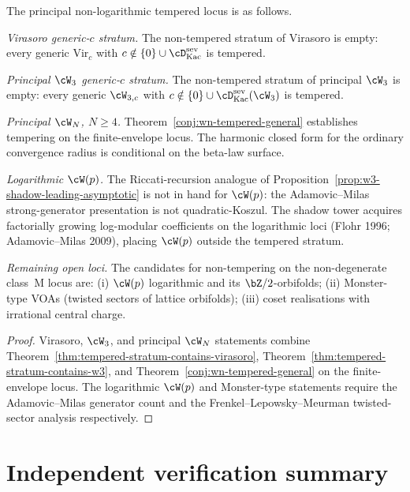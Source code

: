 \begin{corollary}
\label{cor:original-complex-dichotomy-healed}
The principal non-logarithmic tempered locus is as follows.

\emph{Virasoro generic-$c$ stratum.} The non-tempered stratum of
Virasoro is empty: every generic $\mathrm{Vir}_c$ with
$c \notin \{0\} \cup \cD^{\mathrm{sev}}_{\mathrm{Kac}}$ is tempered.

\emph{Principal $\cW_3$ generic-$c$ stratum.} The non-tempered stratum
of principal $\cW_3$ is empty: every generic
$\cW_{3, c}$ with $c \notin \{0\} \cup
\cD^{\mathrm{sev}}_{\mathrm{Kac}}(\cW_3)$ is tempered.

\emph{Principal $\cW_N$, $N \ge 4$.}
Theorem~\ref{conj:wn-tempered-general} establishes tempering on the
finite-envelope locus. The harmonic closed form for the ordinary
convergence radius is conditional on the beta-law surface.

\emph{Logarithmic $\cW(p)$.} The Riccati-recursion analogue of
Proposition~\ref{prop:w3-shadow-leading-asymptotic} is not in hand for
$\cW(p)$: the Adamovic--Milas strong-generator presentation is not
quadratic-Koszul. The shadow tower acquires factorially growing
log-modular coefficients on the logarithmic loci (Flohr 1996;
Adamovic--Milas 2009), placing $\cW(p)$ outside the tempered stratum.

\emph{Remaining open loci.} The candidates for non-tempering on the
non-degenerate class~M locus are: (i) $\cW(p)$ logarithmic and its
$\bZ/2$-orbifolds; (ii) Monster-type VOAs (twisted sectors of
lattice orbifolds); (iii) coset realisations with irrational central
charge.
\end{corollary}

\begin{proof}
Virasoro, $\cW_3$, and principal $\cW_N$ statements combine
Theorem~\ref{thm:tempered-stratum-contains-virasoro},
Theorem~\ref{thm:tempered-stratum-contains-w3}, and
Theorem~\ref{conj:wn-tempered-general} on the finite-envelope locus.
The logarithmic $\cW(p)$ and Monster-type statements require the
Adamovic--Milas generator count and the
Frenkel--Lepowsky--Meurman twisted-sector analysis respectively.
\end{proof}

\section{Independent verification summary}
\label{sec:tempered-stratum-iv-summary}

